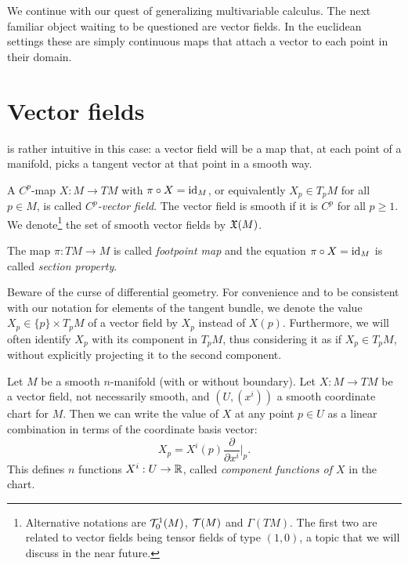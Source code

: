 We continue with our quest of generalizing multivariable calculus.
The next familiar object waiting to be questioned are vector fields.
In the euclidean settings these are simply continuous maps that attach a vector to each point in their domain.

\section{Vector fields}

 is rather intuitive in this case: a vector field will be a map that, at each point of a manifold, picks a tangent vector at that point in a smooth way.

\begin{definition}\label{def:vfield}
  A $C^p$-map $X: M \to TM$ with $\pi\circ X = \operatorname{id}_M$, or equivalently $X_p\in T_pM$ for all $p\in M$, is called \emph{$C^p$-vector field}.
  The vector field is smooth if it is $C^p$ for all $p\geq 1$.
  We denote\footnote{Alternative notations are $\mathcal{T}_0^1(M)$, $\mathcal{T}(M)$ and $\Gamma(TM)$. The first two are related to vector fields being tensor fields of type $(1,0)$, a topic that we will discuss in the near future.} the set of smooth vector fields by $\mathfrak{X}(M)$.

  The map $\pi:TM \to M$ is called \emph{footpoint map} and the equation $\pi\circ X = \operatorname{id}_M$ is called \emph{section property}.
\end{definition}

Beware of the curse of differential geometry.
For convenience and to be consistent with our notation for elements of the tangent bundle, we denote the value $X_p\in\{p\}\times T_p M$ of a vector field by $X_p$ instead of $X(p)$.
Furthermore, we will often identify $X_p$ with its component in $T_pM$, thus considering it as if $X_p\in T_pM$, without explicitly projecting it to the second component.

Let $M$ be a smooth $n$-manifold (with or without boundary).
Let $X:M\to TM$ be a vector field, not necessarily smooth, and $(U, (x^i))$ a smooth coordinate chart for $M$. Then we can write the value of $X$ at any point $p\in U$ as a linear combination in terms of the coordinate basis vector:
\begin{equation}\label{eq:vfCoordBAsis0}
  X_p = X^i(p) \frac{\partial}{\partial x^i}\Big|_p.
\end{equation}
This defines $n$ functions $X^i: U\to\mathbb{R}$, called \emph{component functions of $X$} in the chart.

